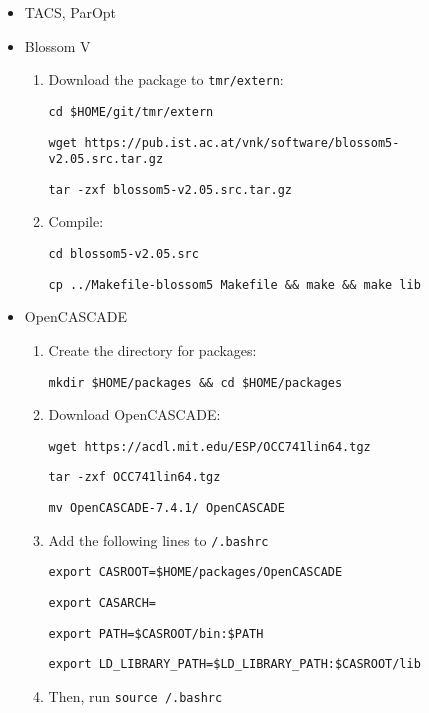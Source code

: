 \documentclass{article}
\begin{document}
\begin{itemize}
    \item TACS, ParOpt

    \item Blossom V

    \begin{enumerate}
        \item Download the package to \texttt{tmr/extern}:

        \texttt{cd \$HOME/git/tmr/extern}

        \texttt{wget https://pub.ist.ac.at/\texttildelow vnk/software/blossom5-v2.05.src.tar.gz}

        \texttt{tar -zxf blossom5-v2.05.src.tar.gz}

        \item Compile:

        \texttt{cd blossom5-v2.05.src}

        \texttt{cp ../Makefile-blossom5 Makefile \&\& make \&\& make lib}

    \end{enumerate}

    \item OpenCASCADE

    \begin{enumerate}
        \item Create the directory for packages:

        \texttt{mkdir \$HOME/packages \&\& cd \$HOME/packages}

        \item Download OpenCASCADE:

        \texttt{wget https://acdl.mit.edu/ESP/OCC741lin64.tgz}

        \texttt{tar -zxf OCC741lin64.tgz}

        \texttt{mv OpenCASCADE-7.4.1/ OpenCASCADE}

        \item Add the following lines to \texttt{\texttildelow/.bashrc}

        \texttt{export CASROOT=\$HOME/packages/OpenCASCADE}

        \texttt{export CASARCH=}

        \texttt{export PATH=\$CASROOT/bin:\$PATH}

        \texttt{export LD\string_LIBRARY\string_PATH=\$LD\string_LIBRARY\string_PATH:\$CASROOT/lib}

        \item Then, run \texttt{source \texttildelow/.bashrc}


\end{enumerate}
\end{itemize}
\end{document}
